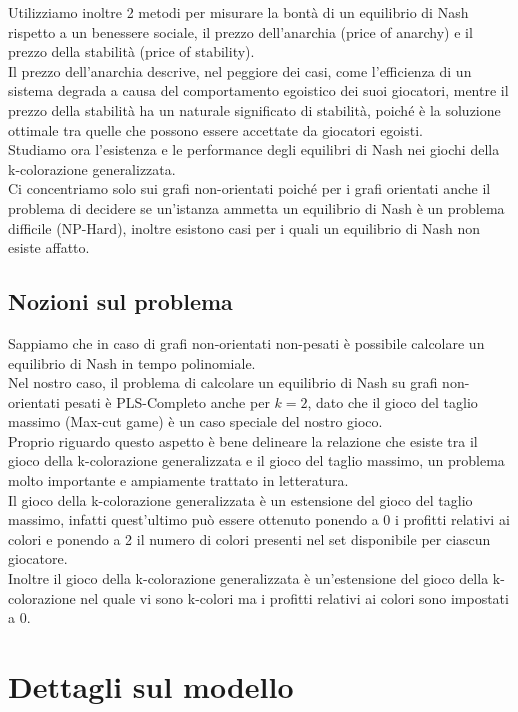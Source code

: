 Utilizziamo inoltre 2 metodi per misurare la bontà di un equilibrio di Nash rispetto a un benessere sociale, il prezzo dell'anarchia (price of anarchy) e il prezzo della stabilità (price of stability).\\
Il prezzo dell'anarchia descrive, nel peggiore dei casi, come l'efficienza di un sistema degrada a causa del comportamento egoistico dei suoi giocatori, mentre il prezzo della stabilità ha un naturale significato di stabilità, poiché è la soluzione ottimale tra quelle che possono essere accettate da giocatori egoisti.\\
Studiamo ora l'esistenza e le performance degli equilibri di Nash nei giochi della k-colorazione generalizzata.\\
Ci concentriamo solo sui grafi non-orientati poiché per i grafi orientati anche il problema di decidere se un'istanza ammetta un equilibrio di Nash è un problema difficile (NP-Hard), inoltre esistono casi per i quali un equilibrio di Nash non esiste affatto.\newline

\subsection{Nozioni sul problema}
\justify
Sappiamo che in caso di grafi non-orientati non-pesati è possibile calcolare un equilibrio di Nash in tempo polinomiale.\\
Nel nostro caso, il problema di calcolare un equilibrio di Nash su grafi non-orientati pesati è PLS-Completo anche per \(k = 2\), dato che il gioco del taglio massimo (Max-cut game) è un caso speciale del nostro gioco.\\
Proprio riguardo questo aspetto è bene delineare la relazione che esiste tra il gioco della k-colorazione generalizzata e il gioco del taglio massimo, un problema molto importante e ampiamente trattato in letteratura.\\
Il gioco della k-colorazione generalizzata è un estensione del gioco del taglio massimo, infatti quest'ultimo può essere ottenuto ponendo a 0 i profitti relativi ai colori e ponendo a 2 il numero di colori presenti nel set disponibile per ciascun giocatore.\\
Inoltre il gioco della k-colorazione generalizzata è un'estensione del gioco della k-colorazione nel quale vi sono k-colori ma i profitti relativi ai colori sono impostati a 0.\newline

\section{Dettagli sul modello}
\justify
